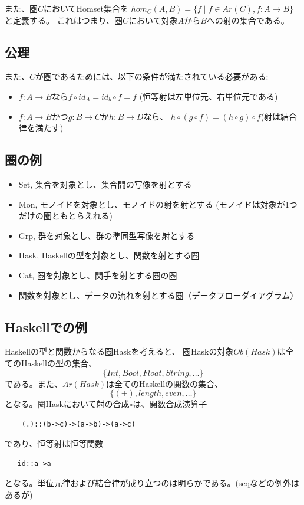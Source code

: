 また、圏$C$においてHomset集合を
$hom_C(A,B)=\{f \mid f \in Ar(C), f: A \to B\}$と定義する。
これはつまり、圏$C$において対象$A$から$B$への射の集合である。

\subsection{公理}
また、$C$が圏であるためには、以下の条件が満たされている必要がある:
\begin{itemize}
    \item $f:A \to B$なら$f \circ id_A = id_b \circ f = f$
        (恒等射は左単位元、右単位元である)
    \item $f:A \to B$かつ$g: B \to C$か$h: B \to D$なら、
        $h \circ (g \circ f)=(h\circ g) \circ f$(射は結合律を満たす)
\end{itemize}

\subsection{圏の例}
\begin{itemize}
    \item Set, 集合を対象とし、集合間の写像を射とする
    \item Mon, モノイドを対象とし、モノイドの射を射とする
        (モノイドは対象が1つだけの圏ともとらえれる)
    \item Grp, 群を対象とし、群の準同型写像を射とする
    \item Hask, Haskellの型を対象とし、関数を射とする圏
    \item Cat, 圏を対象とし、関手を射とする圏の圏
    \item 関数を対象とし、データの流れを射とする圏（データフローダイアグラム）
\end{itemize}

\subsection{Haskellでの例}
Haskellの型と関数からなる圏Haskを考えると、
圏Haskの対象$Ob(Hask)$は全てのHaskellの型の集合、
\[\{Int, Bool, Float, String, \ldots\}\]
である。また、$Ar(Hask)$は全てのHaskellの関数の集合、
\[\{(+), length, even, \ldots\}\]
となる。圏Haskにおいて射の合成$\circ$は、関数合成演算子
\begin{lstlisting}
    (.)::(b->c)->(a->b)->(a->c)
\end{lstlisting}
であり、恒等射は恒等関数
\begin{lstlisting}
   id::a->a
\end{lstlisting}
となる。単位元律および結合律が成り立つのは明らかである。(seqなどの例外はあるが)

